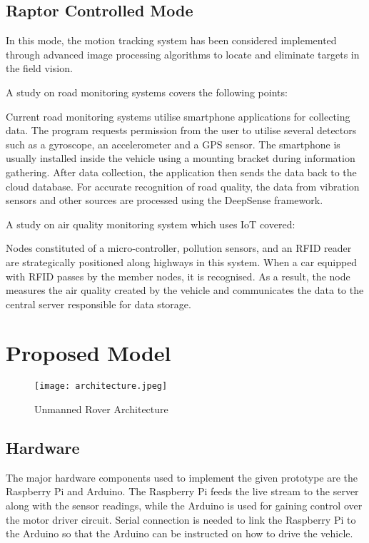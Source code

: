 \documentclass[conference,a4paper]{IEEEtran}
\begin{document}
\subsection{Raptor Controlled Mode}
In this mode, the motion tracking system has been considered implemented through advanced image processing algorithms to locate and eliminate targets in the field vision.

A study on road monitoring systems covers the following points\cite{2}:

Current road monitoring systems utilise smartphone applications for collecting data. The program requests permission from the user to utilise several detectors such as a gyroscope, an accelerometer and a GPS sensor. The smartphone is usually installed inside the vehicle using a mounting bracket during information gathering. After data collection, the application then sends the data back to the cloud database. For accurate recognition of road quality, the data from vibration sensors and other sources are processed using the DeepSense framework.

A study on air quality monitoring system which uses IoT covered\cite{3}:

Nodes constituted of a micro-controller, pollution sensors, and an RFID reader are strategically positioned along highways in this system. When a car equipped with RFID passes by the member nodes, it is recognised. As a result, the node measures the air quality created by the vehicle and communicates the data to the central server responsible for data storage.

\section{Proposed Model}

\begin{figure*}[ht]
\centering
\texttt{[image: architecture.jpeg]}
\caption{Unmanned Rover Architecture}
\label{Fig: Arch}
\end{figure*}

\subsection{Hardware}
The major hardware components used to implement the given prototype are the Raspberry Pi and Arduino. The Raspberry Pi feeds the live stream to the server along with the sensor readings, while the Arduino is used for gaining control over the motor driver circuit. Serial connection is needed to link the Raspberry Pi to the Arduino so that the Arduino can be instructed on how to drive the vehicle.
\end{document}
